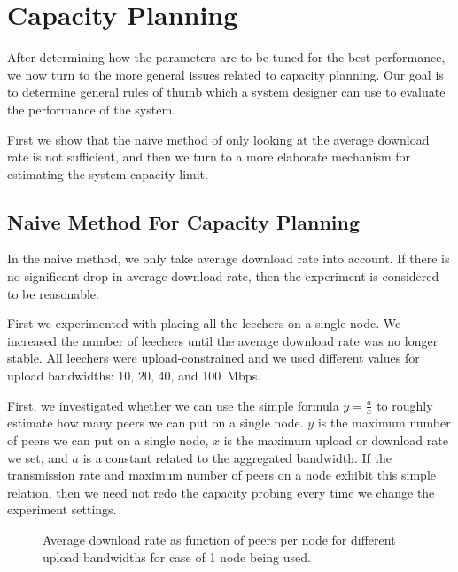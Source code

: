 \documentclass[10pt,letterpaper,twocolumn]{article}
\begin{document}
\section{Capacity Planning}
\label{capacity_planning}

After determining how the parameters are to be tuned for the best
performance, we now turn to the more general issues related to
capacity planning. Our goal is to determine general rules of thumb
which a system designer can use to evaluate the performance of the
system. 



First we show that the naive method of only looking at the average
download rate is not sufficient, and then we turn to a more elaborate
mechanism for estimating the system capacity limit.



\subsection{Naive Method For Capacity Planning}
\label{sec:naive-meth-capac}

In the naive method, we only take average download rate into
account. If there is no significant drop in average download rate,
then the experiment is considered to be reasonable.

First we experimented with placing all the leechers on a single
node. We increased the number of leechers until the average download
rate was no longer stable. All leechers were upload-constrained and we
used different values for upload bandwidths: 10, 20, 40, and
100~Mbps.



First, we investigated whether we can use the simple formula
$y=\frac{a}{x}$ to roughly estimate how many peers we can put on a
single node. $y$ is the maximum number of peers we can put on a single
node, $x$ is the maximum upload or download rate we set, and $a$ is a
constant related to the aggregated bandwidth. If the transmission rate
and maximum number of peers on a node exhibit this simple relation,
then we need not redo the capacity probing every time we change the
experiment settings.

\begin{figure}[!tb] 
\centering 
{} 

\caption{Average download rate as function of peers per node for
  different upload bandwidths for case of 1 node being used.}
\label{cap_1} 
\end{figure}
\end{document}
